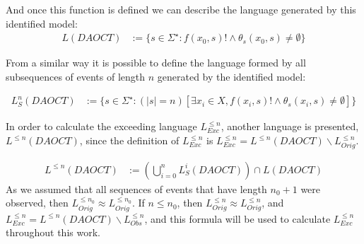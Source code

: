 And once this function is defined we can describe the language generated by this
identified model:
\begin{align}
  L(DAOCT)&:=\{s \in \Sigma^\star : f(x_0,s)! \wedge \theta_s(x_0,s)\neq \emptyset \}
\end{align}

From a similar way it is possible to define the language formed by all
subsequences of events of length $n$ generated by the identified model:

\begin{align}
  L_S^n(DAOCT)&:=\{s \in \Sigma^\star : (|s| = n)\left[\exists x_i \in X,f(x_i,s)! \wedge \theta_s(x_i,s)\neq \emptyset \right]\}
\end{align}

In order to calculate the exceeding language $L_{Exc}^{\leq n}$, another
language is presented, $L^{\leq n}(DAOCT)$, since the definition of
$L_{Exc}^{\leq n}$ is $L_{Exc}^{\leq n}=L^{\leq n}(DAOCT)\backslash
L_{Orig}^{\leq n}$.


\begin{align}
  L^{\leq n}(DAOCT)&:=\left( \bigcup_{i=0}^n L_S^i(DAOCT) \right)\cap L(DAOCT)
\end{align}
As we assumed that all sequences of events that have length $n_0+1$ were
observed, then $L_{Orig}^{\leq n_0}\approx L_{Orig}^{\leq n_0}$. If $n\leq n_0$,
then $L_{Orig}^{\leq n}\approx L_{Orig}^{\leq n}$, and $L_{Exc}^{\leq n}=L^{\leq n}(DAOCT)\backslash
L_{Obs}^{\leq n}$, and this formula will be used to calculate $L_{Exc}^{\leq n}$
throughout this work. 
